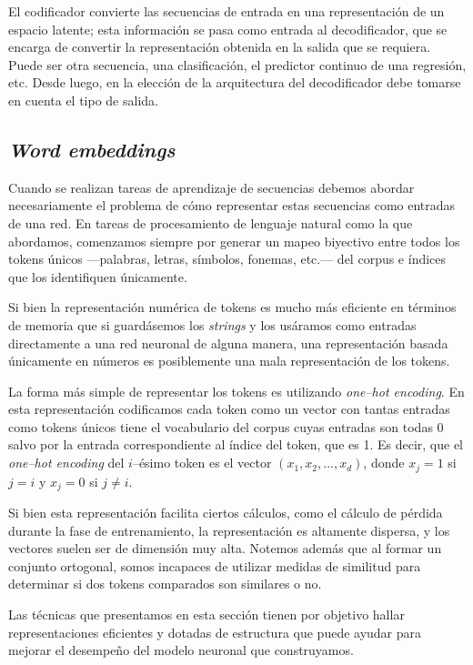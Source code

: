 \documentclass[12pt]{article}
\begin{document}
El codificador convierte las secuencias de entrada en una representación de un espacio latente; esta información se pasa como entrada al decodificador, que se encarga de convertir la representación obtenida en la salida que se requiera. Puede ser otra secuencia, una clasificación, el predictor continuo de una regresión, etc. Desde luego, en la elección de la arquitectura del decodificador debe tomarse en cuenta el tipo de salida.

\subsection{\textit{Word embeddings}}

Cuando se realizan tareas de aprendizaje de secuencias debemos abordar necesariamente el problema de cómo representar estas secuencias como entradas de una red. En tareas de procesamiento de lenguaje natural como la que abordamos, comenzamos siempre por generar un mapeo biyectivo entre todos los tokens únicos ---palabras, letras, símbolos, fonemas, etc.---  del corpus e índices que los identifiquen únicamente. 

Si bien la representación numérica de tokens es mucho más eficiente en términos de memoria que si guardásemos los \textit{strings} y los usáramos como entradas directamente a una red neuronal de alguna manera, una representación basada únicamente en números es posiblemente una mala representación de los tokens. 

La forma más simple de representar los tokens es utilizando \textit{one--hot encoding}. En esta representación codificamos cada token como un vector con tantas entradas como tokens únicos tiene el vocabulario del corpus cuyas entradas son todas 0 salvo por la entrada correspondiente al índice del token, que es 1. Es decir, que el \textit{one--hot encoding} del $ i $--ésimo token es el vector $ (x_1, x_2, ..., x_d) $, donde $ x_j = 1 $ si $ j = i $ y $ x_j = 0 $ si $ j \neq i $.

Si bien esta representación facilita ciertos cálculos, como el cálculo de pérdida durante la fase de entrenamiento, la representación es altamente dispersa, y los vectores suelen ser de dimensión muy alta. Notemos además que al formar un conjunto ortogonal, somos incapaces de utilizar medidas de similitud para determinar si dos tokens comparados son similares o no. 

Las técnicas que presentamos en esta sección tienen por objetivo hallar representaciones eficientes y dotadas de estructura que puede ayudar para mejorar el desempeño del modelo neuronal que construyamos.
\end{document}
